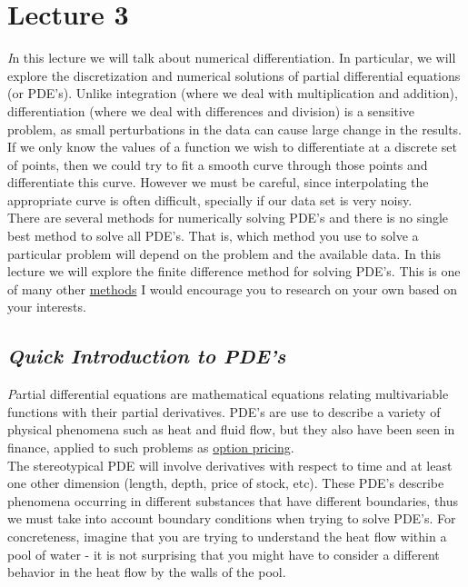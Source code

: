 \documentclass[11pt,a4paper,oneside]{report}
\begin{document}
\section*{Lecture 3}

{\it \huge I}n this lecture we will talk about numerical differentiation. In particular, we will explore the discretization and numerical solutions of partial differential equations (or PDE's). Unlike integration (where we deal with multiplication and addition), differentiation (where we deal with differences and division) is a sensitive problem, as small perturbations in the data can cause large change in the results.\\

If we only know the values of a function we wish to differentiate at a discrete set of points, then we could try to fit a smooth curve through those points and differentiate this curve. However we must be careful, since interpolating the appropriate curve is often difficult, specially if our data set is very noisy. \\

There are several methods for numerically solving PDE's and there is no single best method to solve all PDE's. That is, which method you use to solve a particular problem will depend on the problem and the available data. In this lecture we will explore the finite difference method for solving PDE's. This is one of many other \href{https://en.wikipedia.org/wiki/Numerical_partial_differential_equations}{methods} I would encourage you to research on your own based on your interests.\\

{\center\color{magenta}
\subsection*{\it\huge Quick Introduction to PDE's}}
{\it\huge P}artial differential equations are mathematical equations relating multivariable functions with their partial derivatives. PDE's are use to describe a variety of physical phenomena such as heat and fluid flow, but they also have been seen in finance, applied to such problems as \href{http://en.wikipedia.org/wiki/Finite_difference_methods_for_option_pricing}{option pricing}.\\

The stereotypical PDE will involve derivatives with respect to time and at least one other dimension (length, depth, price of stock, etc). These PDE's describe phenomena occurring in different substances that have different boundaries, thus we must take into account boundary conditions when trying to solve PDE's. For concreteness, imagine that you are trying to understand the heat flow within a pool of water - it is not surprising that you might have to consider a different behavior in the heat flow by the walls of the pool. \\ %
\end{document}
